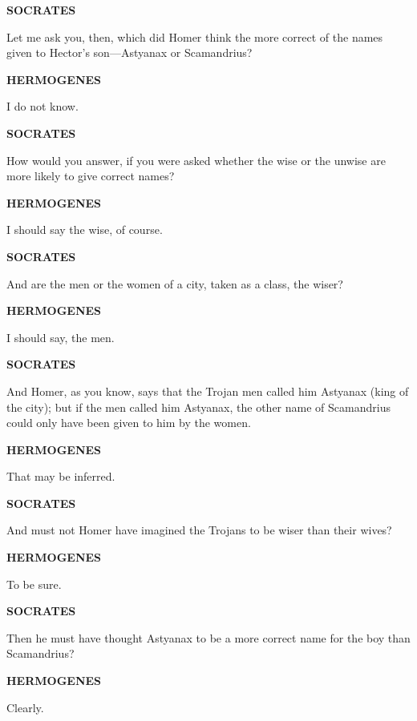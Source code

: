 \documentclass[11pt,letter]{article}
\begin{document}
\par \textbf{SOCRATES}
\par   Let me ask you, then, which did Homer think the more correct of the names given to Hector’s son—Astyanax or Scamandrius?

\par \textbf{HERMOGENES}
\par   I do not know.

\par \textbf{SOCRATES}
\par   How would you answer, if you were asked whether the wise or the unwise are more likely to give correct names?

\par \textbf{HERMOGENES}
\par   I should say the wise, of course.

\par \textbf{SOCRATES}
\par   And are the men or the women of a city, taken as a class, the wiser?

\par \textbf{HERMOGENES}
\par   I should say, the men.

\par \textbf{SOCRATES}
\par   And Homer, as you know, says that the Trojan men called him Astyanax (king of the city); but if the men called him Astyanax, the other name of Scamandrius could only have been given to him by the women.

\par \textbf{HERMOGENES}
\par   That may be inferred.

\par \textbf{SOCRATES}
\par   And must not Homer have imagined the Trojans to be wiser than their wives?

\par \textbf{HERMOGENES}
\par   To be sure.

\par \textbf{SOCRATES}
\par   Then he must have thought Astyanax to be a more correct name for the boy than Scamandrius?

\par \textbf{HERMOGENES}
\par   Clearly.
\end{document}
